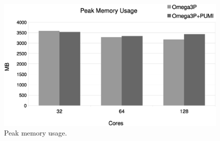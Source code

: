 \documentclass[a4paper]{article}
\begin{document}
\begin{figure}[ht]
\centering
  \includegraphics[width=\textwidth]{peak-memory-usage.eps}
  \caption{\label{fig:memusage} Peak memory usage.}
\end{figure}

\newpage


\end{document}
